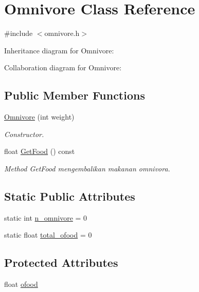\hypertarget{classOmnivore}{}\section{Omnivore Class Reference}
\label{classOmnivore}


{\ttfamily \#include $<$omnivore.\+h$>$}



Inheritance diagram for Omnivore\+:


Collaboration diagram for Omnivore\+:
\subsection*{Public Member Functions}
\begin{DoxyCompactItemize}
\item 
\hyperlink{classOmnivore_a8e20388c09d013115ebe629c8e5b027a}{Omnivore} (int weight)
\begin{DoxyCompactList}\small\item\em Constructor. \end{DoxyCompactList}\item 
float \hyperlink{classOmnivore_a701d76169b7ac6581fa4b9434902f04b}{Get\+Food} () const \hypertarget{classOmnivore_a701d76169b7ac6581fa4b9434902f04b}{}\label{classOmnivore_a701d76169b7ac6581fa4b9434902f04b}

\begin{DoxyCompactList}\small\item\em Method Get\+Food mengembalikan makanan omnivora. \end{DoxyCompactList}\end{DoxyCompactItemize}
\subsection*{Static Public Attributes}
\begin{DoxyCompactItemize}
\item 
static int \hyperlink{classOmnivore_ab625c981d2a5a3c2e6f72fae17ea0bf0}{n\+\_\+omnivore} = 0
\item 
static float \hyperlink{classOmnivore_ac4e106c20ef52747fb78f22765beaa64}{total\+\_\+ofood} = 0
\end{DoxyCompactItemize}
\subsection*{Protected Attributes}
\begin{DoxyCompactItemize}
\item 
float \hyperlink{classOmnivore_a71b234f7a70601f96a92c3a16d373d17}{ofood}
\end{DoxyCompactItemize}


